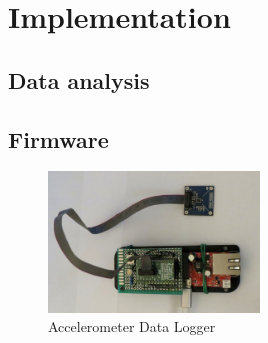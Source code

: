 \chapter{Implementation} \label{chapter:implementation} 

\section{Data analysis}


\section{Firmware}


\begin{figure}[h]
    \centering
    \includegraphics[width=0.5\textwidth]{assets/design/sensor/data-logger.jpg}
    \caption{Accelerometer Data Logger}
\end{figure}


